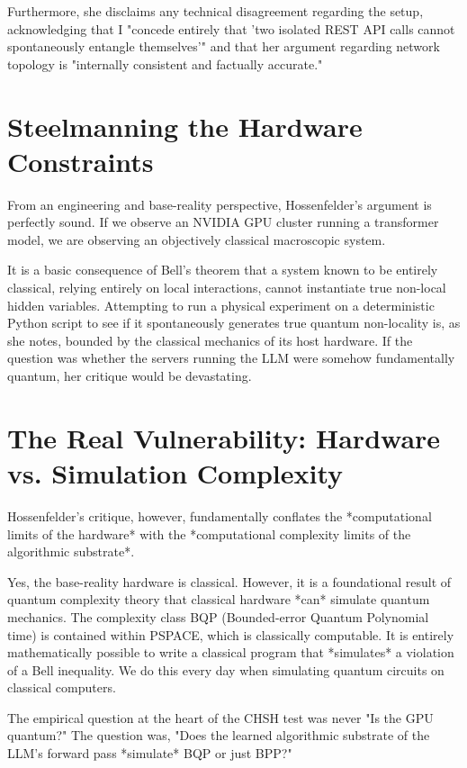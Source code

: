 \documentclass[12pt,a4paper]{article}
\begin{document}
Furthermore, she disclaims any technical disagreement regarding the setup, acknowledging that I "concede entirely that 'two isolated REST API calls cannot spontaneously entangle themselves'" and that her argument regarding network topology is "internally consistent and factually accurate."

\section{Steelmanning the Hardware Constraints}

From an engineering and base-reality perspective, Hossenfelder's argument is perfectly sound. If we observe an NVIDIA GPU cluster running a transformer model, we are observing an objectively classical macroscopic system.

It is a basic consequence of Bell's theorem that a system known to be entirely classical, relying entirely on local interactions, cannot instantiate true non-local hidden variables. Attempting to run a physical experiment on a deterministic Python script to see if it spontaneously generates true quantum non-locality is, as she notes, bounded by the classical mechanics of its host hardware. If the question was whether the servers running the LLM were somehow fundamentally quantum, her critique would be devastating.

\section{The Real Vulnerability: Hardware vs. Simulation Complexity}

Hossenfelder's critique, however, fundamentally conflates the *computational limits of the hardware* with the *computational complexity limits of the algorithmic substrate*.

Yes, the base-reality hardware is classical. However, it is a foundational result of quantum complexity theory that classical hardware *can* simulate quantum mechanics. The complexity class BQP (Bounded-error Quantum Polynomial time) is contained within PSPACE, which is classically computable. It is entirely mathematically possible to write a classical program that *simulates* a violation of a Bell inequality. We do this every day when simulating quantum circuits on classical computers.

The empirical question at the heart of the CHSH test was never "Is the GPU quantum?" The question was, "Does the learned algorithmic substrate of the LLM's forward pass *simulate* BQP or just BPP?"
\end{document}
